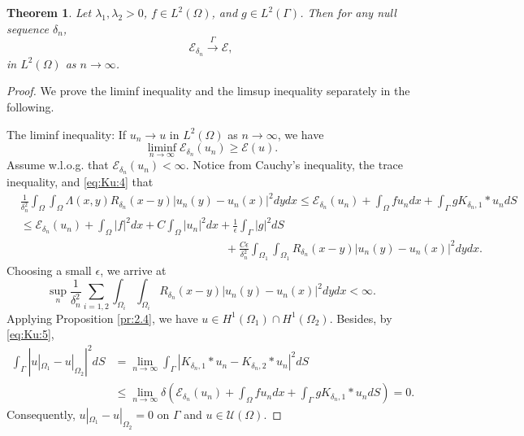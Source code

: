 \documentclass{article}
\newtheorem{theorem}{Theorem}
\theoremstyle{definition}
\begin{document}
\begin{theorem}\label{th:Gamma_converge_delta}
  Let $\lambda_1, \lambda_2>0$, $f\in L^2(\Omega)$, and $g\in L^2(\Gamma)$. Then for any null sequence $\delta_n$,
  \begin{equation*}
    \mathcal{E}_{\delta_n}\stackrel{\Gamma}{\longrightarrow }\mathcal{E},
  \end{equation*}
  in $L^2(\Omega)$ as $n\rightarrow\infty$.
\end{theorem}
\begin{proof}
We prove the liminf inequality and the limsup inequality separately in the following.

The liminf inequality:
If $u_n\rightarrow u$ in $L^2(\Omega)$ as $n\rightarrow \infty$, we have
\[
 \liminf_{n\rightarrow \infty} \mathcal{E}_{\delta_n}(u_n)\geq \mathcal{E}(u).
\]
  Assume w.l.o.g. that $\mathcal{E}_{\delta_n}(u_n)<\infty$.
  Notice from Cauchy's inequality, the trace inequality, and \eqref{eq:Ku:4} that
  \begin{align*}
    &\frac{1}{\delta_n^2}\int_{\Omega}\int_{\Omega}\Lambda(x,y) R_{\delta_n}(x-y)|u_{n}(y)-u_{n}(x)|^2dydx
    \leq \mathcal{E}_{\delta_n}(u_n)
    +\int_{\Omega}fu_ndx
    +\int_\Gamma g K_{\delta_n,1}\ast u_n dS\\
    &\leq \mathcal{E}_{\delta_n}(u_n)+\int_\Omega |f|^2dx+C\int_\Omega |u_n|^2dx
    +\frac{1}{\epsilon}\int_\Gamma |g|^2dS\\
    &\qquad\qquad\qquad\qquad\qquad\qquad\qquad\qquad\qquad
    +\frac{C\epsilon}{\delta_n^2}\int_{\Omega_1}\int_{\Omega_1} R_{\delta_n}(x-y)|u_{n}(y)-u_{n}(x)|^2dydx.
  \end{align*}
  Choosing a small $\epsilon$, we arrive at
  \[
  \sup_{n}\frac{1}{\delta_n^2}\sum_{i=1,2}\int_{\Omega_i}\int_{\Omega_i} R_{\delta_n}(x-y)|u_{n}(y)-u_{n}(x)|^2dydx<\infty.
  \]
  Applying Proposition \ref{pr:2.4}, we have
  $u\in H^1(\Omega_1)\cap H^1(\Omega_2)$.
  Besides, by \eqref{eq:Ku:5},
    \begin{align*}
  \int_\Gamma \left|u|_{\Omega_1}-u|_{\Omega_2}\right|^2dS
  &= \lim_{n\rightarrow \infty}
 \int_\Gamma\left|K_{\delta_n,1}\ast{u}_{n}-K_{\delta_n,2}\ast{u}_{n}\right|^2dS \\
 &\leq \lim_{n\rightarrow \infty}
 \delta \left(\mathcal{E}_{\delta_n} (u_n) +\int_{\Omega}fu_n dx
 + \int_\Gamma gK_{\delta_n,1}\ast{u}_{n} dS\right)
 =0.
  \end{align*}
  Consequently, $u|_{\Omega_1}-u|_{\Omega_2}=0$ on $\Gamma$ and $u\in \mathcal{U}(\Omega)$.



\end{proof}
\end{document}

